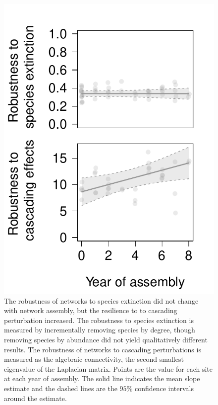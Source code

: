 \documentclass[12pt]{article}
\begin{document}
\begin{figure}
  \centering
  \includegraphics[width=.5\textwidth]{../analysis/networkLevel/figures/robustness.pdf}
  \caption{The robustness of networks to species extinction did not
    change with network assembly, but the resilience to to cascading
    perturbation increased. The robustness to species extinction is
    measured by incrementally removing species by degree, though
    removing species by abundance did not yield qualitatively
    different results. The robustness of networks to cascading
    perturbations is measured as the algebraic connectivity, the
    second smallest eigenvalue of the Laplacian matrix. Points are the
    value for each site at each year of assembly. The solid line
    indicates the mean slope estimate and the dashed lines are the
    $95\%$ confidence intervals around the estimate.}
  \label{fig:rob}
\end{figure}
\clearpage
\end{document}
